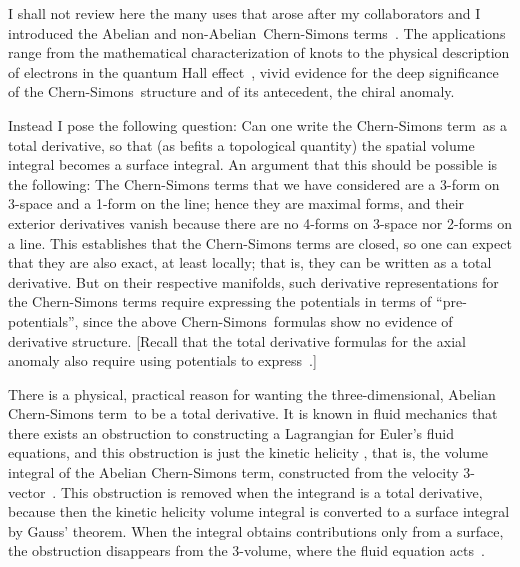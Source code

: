 \documentclass[a4paper,12pt,twoside]{article}
\providecommand{\rd}[1]{\mathop{\mathrm{d}#1}}
\providecommand{\nA}{non-Abelian}
\providecommand{\CS}{Chern-Simons}
\providecommand{\CSt}{Chern-Simons term}
\let\vec\boldsymbol
\begin{document}
I shall not review here the many uses that arose after my collaborators and I
introduced  the Abelian and
\nA\ 
\CSt s~\cite{ref7}. The applications range from the
mathematical characterization of knots to the physical description of electrons in the
quantum Hall effect~\cite{ref9},  vivid evidence for the deep significance of the \CS\
structure and of its antecedent, the chiral anomaly.

Instead I pose the following question: Can one write the \CSt\ as a total derivative, so
that (as befits a topological quantity) the spatial volume integral becomes a surface
integral. An argument that this should be possible is the following: The
\CSt s that we have considered are a 3-form on 3-space and a 1-form on the line;
hence they are maximal forms, and their exterior derivatives vanish because there
are no 4-forms on 3-space nor 2-forms on a line. This establishes that the \CSt s are
closed, so one can expect that they are also exact, at least locally; that is, they can be
written as a total derivative.  But on their respective manifolds,  such derivative 
representations for the
\CSt s require expressing the potentials in terms of ``pre-potentials'', since the 
above \CS\ formulas show no evidence of derivative structure.
[Recall that the total derivative formulas  for
the axial anomaly also require using potentials to express~\coordHE{}.]

There is a physical, practical reason for wanting the three-dimensional, Abelian \CSt\ 
to be a total derivative. It is known in fluid mechanics that there exists an
obstruction to constructing a Lagrangian for Euler's fluid equations, and this
obstruction is just the kinetic helicity  \hbox{\myHighlight{$\int \rd{^3 r} \vec v\cdot
\vec\omega$}\coordHE{}}, that is, the volume integral of the Abelian \CSt, constructed from the
velocity 3-vector~\myHighlight{$\vec v$}\coordHE{}. This obstruction is removed when the integrand is a total
derivative, because then the kinetic helicity volume integral is converted to a surface
integral by Gauss' theorem. When the integral obtains contributions only from a
surface,  the obstruction disappears from the 3-volume, where the fluid equation
acts~\cite{ref10}. 
\end{document}
